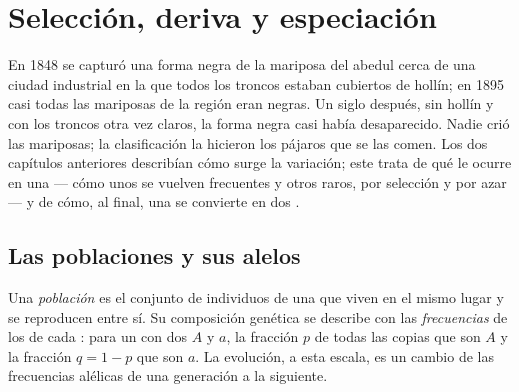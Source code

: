 \chapter{Selección, deriva y especiación}\label{ch:g12:selection-drift-speciation}

En 1848 se capturó una forma negra de la mariposa del abedul cerca de
una ciudad industrial en la que todos los troncos estaban cubiertos de
hollín; en 1895 casi todas las mariposas de la región eran negras. Un
siglo después, sin hollín y con los troncos otra vez claros, la forma
negra casi había desaparecido. Nadie crió las mariposas; la
clasificación la hicieron los pájaros que se las comen. Los dos
capítulos anteriores describían cómo surge la variación; este trata de
qué le ocurre en una  --- cómo unos  se vuelven
frecuentes y otros raros, por selección y por azar --- y de cómo, al
final, una  se convierte en dos .

\section{Las poblaciones y sus alelos}

\begin{definition}\label{def:g12:selection-drift-speciation:population}
Una \emph{población} es el conjunto de individuos de
una  que viven en el mismo lugar y se reproducen entre sí. Su
composición genética se describe con las
\emph{frecuencias} de los  de cada
: para un  con dos  $A$ y $a$, la fracción $p$ de todas las
copias que son $A$ y la fracción $q = 1 - p$ que son $a$. La evolución,
a esta escala, es un cambio de las frecuencias alélicas de una
generación a la siguiente.
\end{definition}


